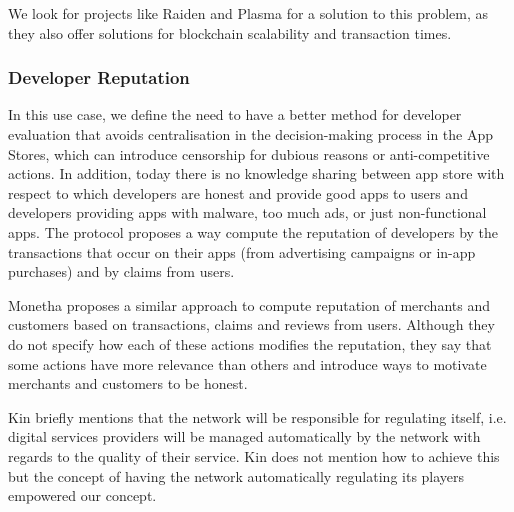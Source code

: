 We look for projects like Raiden and Plasma for a solution to this problem, as they also offer solutions for blockchain scalability and transaction times.

\subsubsection{Developer Reputation}

In this use case, we define the need to have a better method for developer evaluation that avoids centralisation in the decision-making process in the App Stores, which can introduce censorship for dubious reasons or anti-competitive actions. In addition, today there is no knowledge sharing between app store with respect to which developers are honest and provide good apps to users and developers providing apps with malware, too much ads, or just non-functional apps. The protocol proposes a way compute the reputation of developers by the transactions that occur on their apps (from advertising campaigns or in-app purchases) and by claims from users.

Monetha proposes a similar approach to compute reputation of merchants and customers based on transactions, claims and reviews from users. Although they do not specify how each of these actions modifies the reputation, they say that some actions have more relevance than others and introduce ways to motivate merchants and customers to be honest.

Kin briefly mentions that the network will be responsible for regulating itself, i.e. digital services providers will be managed automatically by the network with regards to the quality of their service. Kin does not mention how to achieve this but the concept of having the network automatically regulating its players empowered our concept.

